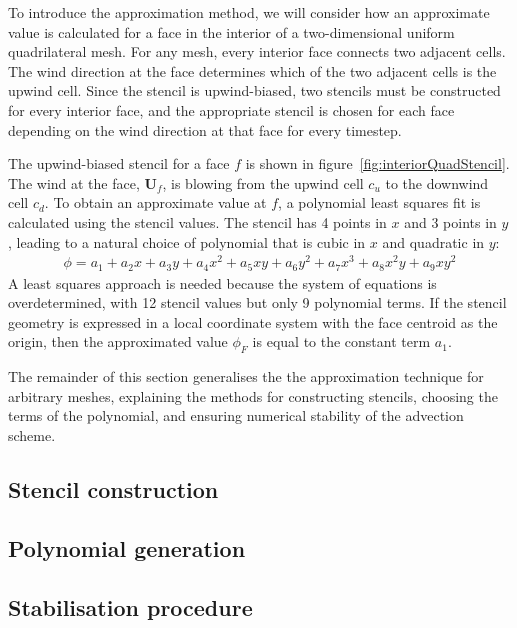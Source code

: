 \documentclass{standalone}
\begin{document}
To introduce the approximation method, we will consider how an approximate value is calculated for a face in the interior of a two-dimensional uniform quadrilateral mesh.  For any mesh, every interior face connects two adjacent cells.  The wind direction at the face determines which of the two adjacent cells is the upwind cell.  Since the stencil is upwind-biased, two stencils must be constructed for every interior face, and the appropriate stencil is chosen for each face depending on the wind direction at that face for every timestep.

The upwind-biased stencil for a face $f$ is shown in figure~\ref{fig:interiorQuadStencil}.  The wind at the face, $\bm{U}_f$, is blowing from the upwind cell $c_u$ to the downwind cell $c_d$.
To obtain an approximate value at $f$, a polynomial least squares fit is calculated using the stencil values.
The stencil has \num{4} points in $x$ and \num{3} points in $y$, leading to a natural choice of polynomial that is cubic in $x$ and quadratic in $y$:
\begin{align}
	\phi = a_1 + a_2 x + a_3 y + a_4 x^2 + a_5 xy + a_6 y^2 + a_7 x^3 + a_8 x^2 y + a_9 x y^2
\end{align}
A least squares approach is needed because the system of equations is overdetermined, with \num{12} stencil values but only \num{9} polynomial terms.  If the stencil geometry is expressed in a local coordinate system with the face centroid as the origin, then the approximated value $\phi_F$ is equal to the constant term $a_1$.

The remainder of this section generalises the the approximation technique for arbitrary meshes, explaining the methods for constructing stencils, choosing the terms of the polynomial, and ensuring numerical stability of the advection scheme.

\subsection{Stencil construction}

\subsection{Polynomial generation}

\subsection{Stabilisation procedure}
\end{document}
